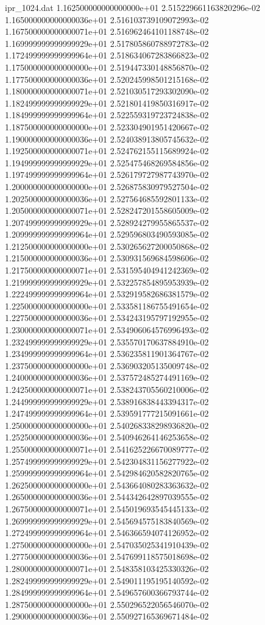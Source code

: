 \begin{filecontents}{ipr_1024.dat}
1.162500000000000000e+01 2.515229661163820296e-02
1.165000000000000036e+01 2.516103739109072993e-02
1.167500000000000071e+01 2.516962464101188748e-02
1.169999999999999929e+01 2.517805860788972783e-02
1.172499999999999964e+01 2.518634067283866823e-02
1.175000000000000000e+01 2.519447330148856870e-02
1.177500000000000036e+01 2.520245998501215168e-02
1.180000000000000071e+01 2.521030517293302090e-02
1.182499999999999929e+01 2.521801419850316917e-02
1.184999999999999964e+01 2.522559319723724838e-02
1.187500000000000000e+01 2.523304901951420667e-02
1.190000000000000036e+01 2.524038913805745632e-02
1.192500000000000071e+01 2.524762155115689924e-02
1.194999999999999929e+01 2.525475468269584856e-02
1.197499999999999964e+01 2.526179727987743970e-02
1.200000000000000000e+01 2.526875830979527504e-02
1.202500000000000036e+01 2.527564685592801133e-02
1.205000000000000071e+01 2.528247201558605009e-02
1.207499999999999929e+01 2.528924279955865537e-02
1.209999999999999964e+01 2.529596803490593085e-02
1.212500000000000000e+01 2.530265627200050868e-02
1.215000000000000036e+01 2.530931569684598606e-02
1.217500000000000071e+01 2.531595404941242369e-02
1.219999999999999929e+01 2.532257854895953939e-02
1.222499999999999964e+01 2.532919582686381579e-02
1.225000000000000000e+01 2.533581186755491654e-02
1.227500000000000036e+01 2.534243195797192955e-02
1.230000000000000071e+01 2.534906064576996493e-02
1.232499999999999929e+01 2.535570170637884910e-02
1.234999999999999964e+01 2.536235811901364767e-02
1.237500000000000000e+01 2.536903205135009748e-02
1.240000000000000036e+01 2.537572485274491169e-02
1.242500000000000071e+01 2.538243705560210006e-02
1.244999999999999929e+01 2.538916838443394317e-02
1.247499999999999964e+01 2.539591777215091661e-02
1.250000000000000000e+01 2.540268338298936820e-02
1.252500000000000036e+01 2.540946264146253658e-02
1.255000000000000071e+01 2.541625226670089777e-02
1.257499999999999929e+01 2.542304831156277922e-02
1.259999999999999964e+01 2.542984620582820765e-02
1.262500000000000000e+01 2.543664080283363632e-02
1.265000000000000036e+01 2.544342642897039555e-02
1.267500000000000071e+01 2.545019693545445133e-02
1.269999999999999929e+01 2.545694575183840569e-02
1.272499999999999964e+01 2.546366594074126952e-02
1.275000000000000000e+01 2.547035025341910439e-02
1.277500000000000036e+01 2.547699118575018698e-02
1.280000000000000071e+01 2.548358103425330326e-02
1.282499999999999929e+01 2.549011195195140592e-02
1.284999999999999964e+01 2.549657600366793744e-02
1.287500000000000000e+01 2.550296522056546070e-02
1.290000000000000036e+01 2.550927165369671484e-02

\end{filecontents}
